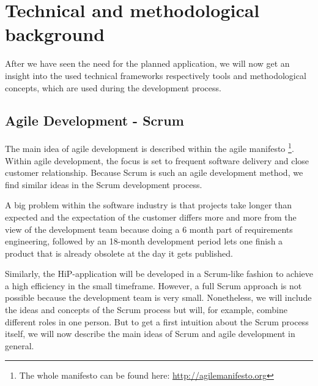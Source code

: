 \chapter[Technical and methodological background]{Technical and methodological background}
After we have seen the need for the planned application, we will now get an insight into the used technical frameworks respectively tools and methodological concepts, which are used during the development process.  

\section{Agile Development - Scrum}
\label{SCRUM-intro}
The main idea of agile development is described within the agile manifesto \cite{Beck2001agile}\footnote{The whole manifesto can be found here: \url{http://agilemanifesto.org}}. Within agile development, the focus is set to frequent software delivery and close customer relationship. Because Scrum is such an agile development method, we find similar ideas in the Scrum development process.

A big problem within the software industry is that projects take longer than expected and the expectation of the customer differs more and more from the view of the development team because doing a 6 month part of requirements engineering, followed by an 18-month development period lets one finish a product that is already obsolete at the day it gets published.

Similarly, the HiP-application will be developed in a Scrum-like fashion to achieve a high efficiency in the small timeframe. However, a full Scrum approach is not possible because the development team is very small. Nonetheless, we will include the ideas and concepts of the Scrum process but will, for example, combine different roles in one person. But to get a first intuition about the Scrum process itself, we will now describe the main ideas of Scrum and agile development in general.

